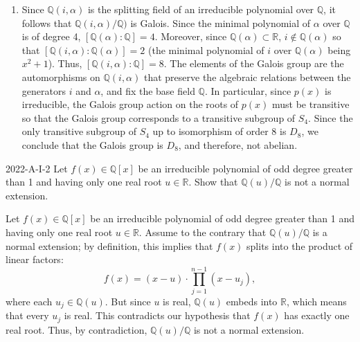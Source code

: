\documentclass{article}
\begin{document}
\begin{enumerate}[itemsep =-2pt,label = (\alph{*})]
\begin{equation*}
		\end{equation*}
		Here, we notice that $\beta = i/\alpha$. Let $K$ be the splitting field of $p(x)$. Then $K$ must contain all four roots of $p(x)$, and therefore, the field $\mathbb{Q}(i, \alpha)$. On the other hand, since $\beta = i/\alpha$, $\mathbb{Q}(i, \alpha)$ already contains all four roots of $p(x)$. Thus, $K = \mathbb{Q}(i, \alpha)$. 
		\item Since $\mathbb{Q}(i, \alpha)$ is the splitting field of an irreducible polynomial over $\mathbb{Q}$, it follows that $\mathbb{Q}(i, \alpha)/\mathbb{Q})$ is Galois. Since the minimal polynomial of $\alpha$ over $\mathbb{Q}$ is of degree 4, $[\mathbb{Q}(\alpha): \mathbb{Q}] = 4$. Moreover, since $\mathbb{Q}(\alpha) \subset \mathbb{R}$, $i \notin \mathbb{Q}(\alpha)$ so that $[\mathbb{Q}(i, \alpha): \mathbb{Q}(\alpha)] = 2$ (the minimal polynomial of $i$ over $\mathbb{Q}(\alpha)$ being $x^{2} + 1$). Thus, $[\mathbb{Q}(i,\alpha): \mathbb{Q}] = 8$. The elements of the Galois group are the automorphisms on $\mathbb{Q}(i,\alpha)$ that preserve the algebraic relations between the generators $i$ and $\alpha$, and fix the base field $\mathbb{Q}$. In particular, since $p(x)$ is irreducible, the Galois group action on the roots of $p(x)$ must be transitive so that the Galois group corresponds to a transitive subgroup of $S_{4}$. Since the only transitive subgroup of $S_{4}$ up to isomorphism of order 8 is $D_{8}$, we conclude that the Galois group is $D_{8}$, and therefore, not abelian. 
	\end{enumerate}
	
	\begin{prb}{2022-A-I-2}
		Let $f(x) \in \mathbb{Q}[x]$ be an irreducible polynomial of odd degree greater than 1 and having only one real root $u \in \mathbb{R}$. Show that $\mathbb{Q}(u)/\mathbb{Q}$ is not a normal extension. 
	\end{prb}
	Let $f(x) \in \mathbb{Q}[x]$ be an irreducible polynomial of odd degree greater than 1 and having only one real root $u \in \mathbb{R}$. Assume to the contrary that $\mathbb{Q}(u)/\mathbb{Q}$ is a normal extension; by definition, this implies that $f(x)$ splits into the product of linear factors: 
	\begin{equation*}
		f(x) = (x - u) \cdot \prod_{j = 1}^{n -1}(x - u_{j}), 
	\end{equation*}
	where each $u_{j} \in \mathbb{Q}(u)$. But since $u$ is real, $\mathbb{Q}(u)$ embeds into $\mathbb{R}$, which means that every $u_{j}$ is real. This contradicts our hypothesis that $f(x)$ has exactly one real root. Thus, by contradiction, $\mathbb{Q}(u)/\mathbb{Q}$ is not a normal extension. 
	
\end{document}
